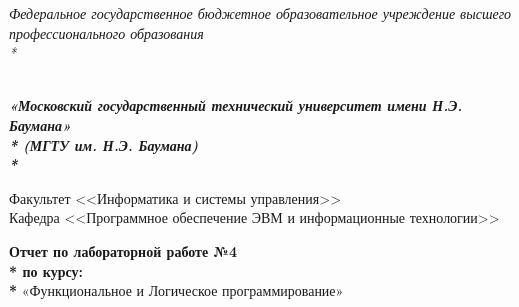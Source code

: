 \newpage
\begin{titlepage}
\thispagestyle{empty}

{\large
\begin{center}
	\textsl{Федеральное государственное бюджетное образовательное учреждение высшего профессионального образования \\* }	
	\vspace{2em}
\end{center}
}
{
\begin{minipage}[t]{0.13\textwidth}
  \centering{}
  \label{fig0}
  \end{minipage}\hfill
\begin{minipage}[t]{0.65\textwidth}
\begin{center}
\large  \textsl{\textbf {\\ «Московский государственный технический университет имени Н.Э. Баумана» \\* (МГТУ им. Н.Э. Баумана) \\* }}
  \end{center}
\end{minipage}
}

\vspace{2em}

\hrulefill

\begin{center}
 	\vspace{0pt plus2fill} %
	{\large
	Факультет  <<Информатика и системы управления>>\\
	Кафедра  <<Программное обеспечение ЭВМ и информационные технологии>>
	}
\end{center}

{\Large
\begin{center}
	\textbf{Отчет по лабораторной работе №4 \\* по курсу: \\* } «Функциональное и Логическое программирование» \\
\end{center}
}
%
\vspace{0pt plus4fill} %


\end{titlepage}
